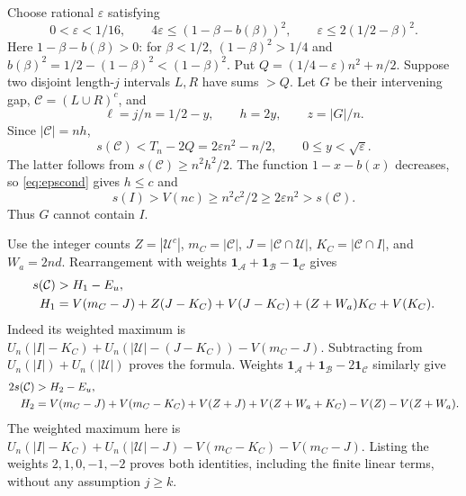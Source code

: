 \documentclass[10pt]{amsart}
\theoremstyle{remark}
\newcommand{\ind}{\mathbf 1}
\newcommand{\Uset}{\mathcal U}
\newcommand{\Cset}{\mathcal C}
\newcommand{\Bset}{\mathcal B}
\newcommand{\Aset}{\mathcal A}
\begin{document}
Choose rational $\varepsilon$ satisfying
\begin{equation}\label{eq:epscond}
 0<\varepsilon<1/16,\qquad
 4\varepsilon\le(1-\beta-b(\beta))^2,\qquad
 \varepsilon\le2(1/2-\beta)^2.
\end{equation}
Here $1-\beta-b(\beta)>0$: for $\beta<1/2$, $(1-\beta)^2>1/4$
and $b(\beta)^2=1/2-(1-\beta)^2<(1-\beta)^2$.
Put $Q=(1/4-\varepsilon)n^2+n/2$. Suppose two disjoint length-$j$
intervals $L,R$ have sums $>Q$. Let $G$ be their intervening gap,
$\Cset=(L\cup R)^c$, and
\[
 \ell=j/n=1/2-y,\qquad h=2y,\qquad z=|G|/n.
\]
Since $|\Cset|=nh$,
\begin{equation}\label{eq:complementmass}
 s(\Cset)<T_n-2Q=2\varepsilon n^2-n/2,
 \qquad 0\le y<\sqrt\varepsilon.
\end{equation}
The latter follows from $s(\Cset)\ge n^2h^2/2$.
The function $1-x-b(x)$ decreases, so \eqref{eq:epscond} gives $h\le c$ and
\begin{equation}\label{eq:coremass}
 s(I)>V(nc)\ge n^2c^2/2\ge2\varepsilon n^2>s(\Cset).
\end{equation}
Thus $G$ cannot contain $I$.

Use the integer counts
$Z=|\Uset^c|$, $m_C=|\Cset|$, $J=|\Cset\cap\Uset|$,
$K_C=|\Cset\cap I|$, and $W_a=2nd$.
Rearrangement with weights $\ind_{\Aset}+\ind_{\Bset}-\ind_{\Cset}$ gives
\begin{align}
 s(\Cset)&>H_1-E_u,\label{eq:H1}\\
 H_1&=V(m_C-J)+Z(J-K_C)+V(J-K_C)
 +(Z+W_a)K_C+V(K_C).\notag
\end{align}
Indeed its weighted maximum is
$U_n(|I|-K_C)+U_n(|\Uset|-(J-K_C))-V(m_C-J)$.
Subtracting from $U_n(|I|)+U_n(|\Uset|)$ proves the formula.
Weights $\ind_{\Aset}+\ind_{\Bset}-2\ind_{\Cset}$ similarly give
\begin{align}
 2s(\Cset)&>H_2-E_u,\label{eq:H2}\\
 H_2&=V(m_C-J)+V(m_C-K_C)+V(Z+J)+V(Z+W_a+K_C)
       -V(Z)-V(Z+W_a).\notag
\end{align}
The weighted maximum here is
$U_n(|I|-K_C)+U_n(|\Uset|-J)-V(m_C-K_C)-V(m_C-J)$.
Listing the weights $2,1,0,-1,-2$ proves both identities, including
the finite linear terms, without any assumption $j\ge k$.
\end{document}
